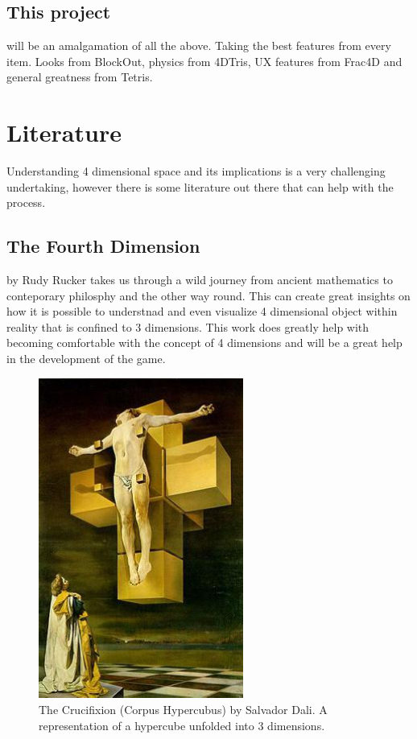 \documentclass{article}
\begin{document}
\subsection{This project}
will be an amalgamation of all the above. Taking the best features from every item. Looks from BlockOut, physics from 4DTris, UX features from Frac4D and general greatness from Tetris.
\section{Literature}
Understanding 4 dimensional space and its implications is a very challenging undertaking, however there is some literature out there that can help with the process. 

\subsection{The Fourth Dimension} by Rudy Rucker \cite{rucker} takes us through a wild journey from ancient mathematics to conteporary philosphy and the other way round. This can create great insights on how it is possible to understnad
and even visualize 4 dimensional object within reality that is confined to 3 dimensions. This work does greatly help with becoming comfortable with the concept of 4 dimensions and will be a great help in the development of the game.
\begin{figure}
    \label{fig:4d}
    \includegraphics[width=0.6\textwidth]{Dali_Crucifixion_hypercube.jpg}
    \caption{The Crucifixion (Corpus Hypercubus) by Salvador Dali. A representation of a hypercube unfolded into 3 dimensions.}
\end{figure}
\end{document}
